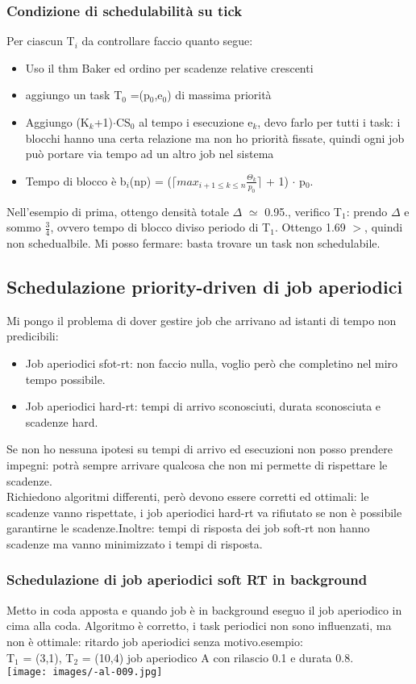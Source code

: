 \documentclass{article}
\begin{document}
\subsubsection{Condizione di schedulabilità su tick}
Per ciascun T$_{i}$ da controllare faccio quanto segue:
\begin{itemize}
\item Uso il thm Baker ed ordino per scadenze relative crescenti
\item aggiungo un task T$_{0}$ =(p$_{0}$,e$_{0}$) di massima priorità
\item Aggiungo (K$_{k}$+1)$\cdot$CS$_{0}$ al tempo i esecuzione e$_{k}$, devo farlo per tutti i task: i blocchi hanno una certa relazione ma non ho priorità fissate, quindi ogni job può portare via tempo ad un altro job nel sistema
\item Tempo di blocco è b$_{i}$(np) = ($\lceil max_{i+1 \leq k \leq n}\frac{\Theta_{k}}{p_{0}}\rceil$ + 1) $\cdot$ p$_{0}$.
\end{itemize}
Nell'esempio di prima, ottengo densità totale $\Delta$ $\simeq$ 0.95., verifico T$_{1}$: prendo $\Delta$ e sommo $\frac{3}{4}$, ovvero tempo di blocco diviso periodo di T$_{1}$. Ottengo 1.69 $>$, quindi non schedualbile. Mi posso fermare: basta trovare un task non schedulabile.
\subsection{Schedulazione priority-driven di job aperiodici}
Mi pongo il problema di dover gestire job che arrivano ad istanti di tempo non predicibili:
\begin{itemize}
\item Job aperiodici sfot-rt: non faccio nulla, voglio però che completino nel miro tempo possibile.
\item Job aperiodici hard-rt: tempi di arrivo sconosciuti, durata sconosciuta e scadenze hard.
\end{itemize}
Se non ho nessuna ipotesi su tempi di arrivo ed esecuzioni non posso prendere impegni: potrà sempre arrivare qualcosa che non mi permette di rispettare le scadenze.\\ Richiedono algoritmi differenti, però devono essere corretti ed ottimali: le scadenze vanno rispettate, i job aperiodici hard-rt va rifiutato se non è possibile garantirne le scadenze.Inoltre: tempi di risposta dei job soft-rt non hanno scadenze ma vanno minimizzato i tempi di risposta.
\subsubsection{Schedulazione di job aperiodici soft RT in background}
Metto in coda apposta e quando job è in background eseguo il job aperiodico in cima alla coda. Algoritmo è corretto, i task periodici non sono influenzati, ma non è ottimale: ritardo job aperiodici senza motivo.esempio:\\
T$_{1}$ = (3,1), T$_{2}$ = (10,4) job aperiodico A con rilascio 0.1 e durata 0.8.\\
\texttt{[image: images/-al-009.jpg]}\\
\end{document}
